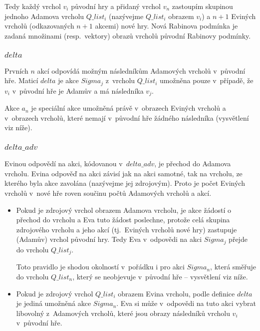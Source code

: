\begin{informal}
Tedy každý vrchol $v_i$ původní hry a přidaný vrchol $v_n$ zastoupím skupinou jednoho Adamova vrcholu $Q\_list_i$ (nazývejme $Q\_list_i$ obrazem $v_i$) a $n+1$ Eviných vrcholů (odkazovaných $n+1$ akcemi) nové hry. Nová Rabinova podmínka je zadaná množinami (resp.~vektory) obrazů vrcholů původní Rabinovy podmínky.
\subsubsection{$delta$}
Prvních $n$ akcí odpovídá možným následníkům Adamových vrcholů v~původní hře. Maticí $delta$ je akce $Sigma_j$ z~vrcholu $Q\_list_i$ umožněna pouze v~případě, že $v_i$ v~původní hře je Adamův a má následníka $v_j$.

Akce $a_n$ je speciální akce umožněná právě v~obrazech Eviných vrcholů a v~obrazech vrcholů, které nemají v~původní hře žádného následníka (vysvětlení viz níže).
\subsubsection{$delta\_adv$}
Evinou odpovědí na akci, kódovanou v~$delta\_adv$, je přechod do Adamova vrcholu. Evina odpověď na akci závisí jak na akci samotné, tak na vrcholu, ze kterého byla akce zavolána (nazývejme jej zdrojovým). Proto je počet Eviných vrcholů v~nové hře roven součinu počtů Adamových vrcholů a akcí.
\begin{itemize}
\item Pokud je zdrojový vrchol obrazem Adamova vrcholu, je akce žádostí o přechod do vrcholu a Eva tuto žádost poslechne, protože celá skupina zdrojového vrcholu a jeho akcí (tj.~Eviných vrcholů nové hry) zastupuje (Adamův) vrchol původní hry. Tedy Eva v~odpovědi na akci $Sigma_j$ přejde do vrcholu $Q\_list_j$.

Toto pravidlo je shodou okolností v~pořádku i pro akci $Sigma_n$, která směřuje do vrcholu $Q\_list_n$, který se neobjevuje v~původní hře -- vysvětlení viz níže.
\item Pokud je zdrojový vrchol $Q\_list_i$ obrazem Evina vrcholu, podle definice $delta$ je jediná umožněná akce $Sigma_n$. Eva si může v~odpovědi na tuto akci vybrat libovolný z~Adamových vrcholů, které jsou obrazy následníků vrcholu $v_i$ v~původní hře.
\end{itemize}

\end{informal}
